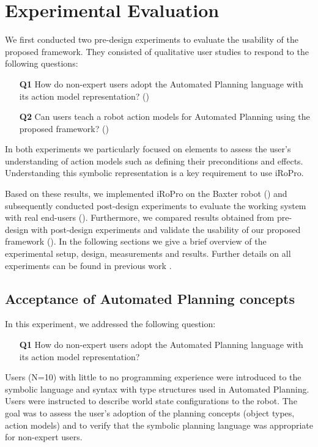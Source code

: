 \section{Experimental Evaluation}\label{sec:exp-eval}
We first conducted two pre-design experiments to evaluate the usability of the proposed framework.
They consisted of qualitative user studies to respond to the following questions:
\begin{enumerate}
	\item[\textbf{Q1}] How do non-expert users adopt the Automated Planning language with its action model representation? ()
	\item[\textbf{Q2}] Can users teach a robot action models for Automated Planning using the proposed framework? ()
\end{enumerate}

In both experiments we particularly focused on elements to assess the user's understanding of action models such as defining their preconditions and effects.
Understanding this symbolic representation is a key requirement to use iRoPro.

Based on these results, we implemented iRoPro on the Baxter robot () and subsequently conducted post-design experiments to evaluate the working system with real end-users ().
Furthermore, we compared results obtained from pre-design with post-design experiments and validate the usability of our proposed framework ().
In the following sections we give a brief overview of the experimental setup, design, measurements and results.
Further details on all experiments can be found in previous work \cite{liang2017b,liang2019d}.


\subsection{Acceptance of Automated Planning concepts}\label{sec:Exp1}
In this experiment, we addressed the following question:
\begin{enumerate}
	\item[\textbf{Q1}] How do non-expert users adopt the Automated Planning language with its action model representation?
\end{enumerate}

Users (N=10) with little to no programming experience were introduced to the symbolic language and syntax with type structures used in Automated Planning.
Users were instructed to describe world state configurations to the robot.
The goal was to assess the user's adoption of the planning concepts (\eg object types, action models) and to verify that the symbolic planning language was appropriate for non-expert users.

